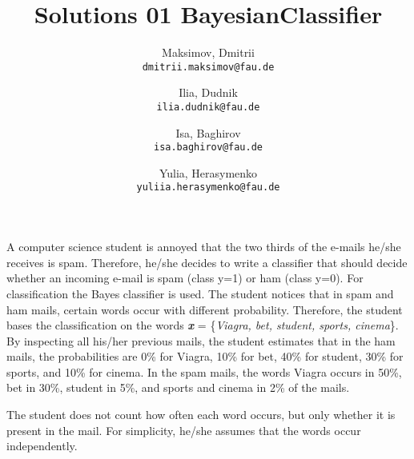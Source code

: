 \documentclass{homework}
\title{Solutions 01 BayesianClassifier}
\author{
  Maksimov, Dmitrii\\
  \texttt{dmitrii.maksimov@fau.de}
  \and
  Ilia, Dudnik\\
  \texttt{ilia.dudnik@fau.de}
  \and
  Isa, Baghirov\\
  \texttt{isa.baghirov@fau.de}
  \and
  Yulia, Herasymenko\\
  \texttt{yuliia.herasymenko@fau.de}
}
\begin{document}
\maketitle

\exercise
A computer science student is annoyed that the two thirds of the e-mails he/she
receives is spam. Therefore, he/she decides to write a classifier that should decide whether an incoming e-mail is spam (class y=1) or ham (class y=0). For
classification the Bayes classifier is used. The student notices that in spam and
ham mails, certain words occur with different probability. Therefore, the student
bases the classification on the words \textbf{\emph{x}} = \{\emph{Viagra, bet, student, sports, cinema}\}. By inspecting all his/her previous mails, the student estimates that in the ham mails, the probabilities are 0\% for Viagra, 10\% for bet, 40\% for student, 30\% for
sports, and 10\% for cinema. In the spam mails, the words Viagra occurs in 50\%,
bet in 30\%, student in 5\%, and sports and cinema in 2\% of the mails.

The student does not count how often each word occurs, but only whether it is present in the mail. For simplicity, he/she assumes that the words occur independently.
\end{document}
